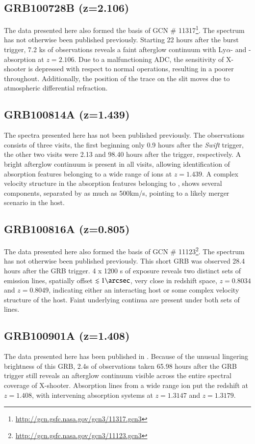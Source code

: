 \documentclass[iop, twocolappendix, numberedappendix, tighten, appendixfloats]{emulateapj}
\newcommand{\lya}{Ly$\alpha$}
\newcommand{\mgii}{\ion{Mg}{2}}
\begin{document}
	\subsection{GRB100728B (z=2.106)}
	The data presented here also formed the basis of GCN \#
	11317\footnote{\url{http://gcn.gsfc.nasa.gov/gcn3/11317.gcn3}}. The spectrum
	has not otherwise been published previously. Starting 22 hours after the burst
	trigger, 7.2 ks of observations reveals a faint afterglow continuum with \lya-
	and \mgii-absorption at $z=2.106$. Due to a malfunctioning ADC, the sensitivity
	of X-shooter is depressed with respect to normal operations, resulting in a
	poorer throughout. Additionally, the position of the trace on the slit moves
	due to atmospheric differential refraction.

	\subsection{GRB100814A (z=1.439)}
    The spectra presented here has not been published previously. The
    observations consists of three visits, the first beginning only 0.9 hours
    after the \textit{Swift} trigger, the other two visits were 2.13 and 98.40
    hours after the trigger, respectively. A bright afterglow continuum is
    present in all visits, allowing identification of absorption features
    belonging to a wide range of ions at $z=1.439$. A complex velocity structure
    in the absorption features belonging to \mgii, shows several components,
    separated by as much as 500km/s, pointing to a likely merger scenario in
    the host.
    
	\subsection{GRB100816A (z=0.805)}
	The data presented here also formed the basis of GCN \#
	11123\footnote{\url{http://gcn.gsfc.nasa.gov/gcn3/11123.gcn3}}. The spectrum
	has not otherwise been published previously. This short GRB was observed 28.4
	hours after the GRB trigger. 4 x 1200 s of exposure reveals two distinct sets
	of emission lines, spatially offset $\lesssim 1 \arcsec $, very close in
	redshift space, $z=0.8034$ and $z=0.8049$, indicating either an interacting
	host or some complex velocity structure of the host. Faint underlying continua
	are present under both sets of lines.

	\subsection{GRB100901A (z=1.408)}
	The data presented here has been published in \citet{Hartoog2013}. Because of
	the unusual lingering brightness of this GRB, 2.4s of observations taken 65.98
	hours after the GRB trigger still reveals an afterglow continuum visible across
	the entire spectral coverage of X-shooter. Absorption lines from a wide range
	ion put the redshift at $z=1.408$, with intervening absorption systems at $z =
	1.3147$ and $z = 1.3179$.
\end{document}
